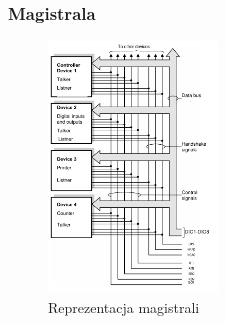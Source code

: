 \subsubsection{Magistrala}
\begin{figure}
	\vspace{0pt}
	\begin{center}
		\includegraphics[width=0.40\textwidth]{./wyklady/IEEE488_SCPI_3_1.pdf}
	\end{center}
	\vspace{-20pt}
	\caption{Reprezentacja magistrali}
	\vspace{-10pt}
\end{figure}

